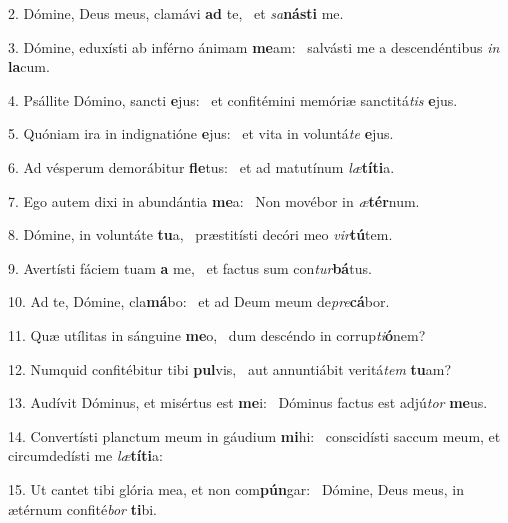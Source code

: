 2. Dómine, Deus meus, clamávi \textbf{ad} te, \ast\  et \textit{sa}\textbf{nás}\textbf{ti} me.\

3. Dómine, eduxísti ab inférno ánimam \textbf{me}am: \ast\  salvásti me a descendéntibus \textit{in} \textbf{la}cum.\

4. Psállite Dómino, sancti \textbf{e}jus: \ast\  et confitémini memóriæ sanctitá\textit{tis} \textbf{e}jus.\

5. Quóniam ira in indignatióne \textbf{e}jus: \ast\  et vita in voluntá\textit{te} \textbf{e}jus.\

6. Ad vésperum demorábitur \textbf{fle}tus: \ast\  et ad matutínum \textit{læ}\textbf{tí}\textbf{ti}a.\

7. Ego autem dixi in abundántia \textbf{me}a: \ast\  Non movébor in \textit{æ}\textbf{tér}num.\

8. Dómine, in voluntáte \textbf{tu}a, \ast\  præstitísti decóri meo \textit{vir}\textbf{tú}tem.\

9. Avertísti fáciem tuam \textbf{a} me, \ast\  et factus sum con\textit{tur}\textbf{bá}tus.\

10. Ad te, Dómine, cla\textbf{má}bo: \ast\  et ad Deum meum de\textit{pre}\textbf{cá}bor.\

11. Quæ utílitas in sánguine \textbf{me}o, \ast\  dum descéndo in corrup\textit{ti}\textbf{ó}nem?\

12. Numquid confitébitur tibi \textbf{pul}vis, \ast\  aut annuntiábit veritá\textit{tem} \textbf{tu}am?\

13. Audívit Dóminus, et misértus est \textbf{me}i: \ast\  Dóminus factus est adjú\textit{tor} \textbf{me}us.\

14. Convertísti planctum meum in gáudium \textbf{mi}hi: \ast\  conscidísti saccum meum, et circumdedísti me \textit{læ}\textbf{tí}\textbf{ti}a:\

15. Ut cantet tibi glória mea, et non com\textbf{pún}gar: \ast\  Dómine, Deus meus, in ætérnum confité\textit{bor} \textbf{ti}bi.\

